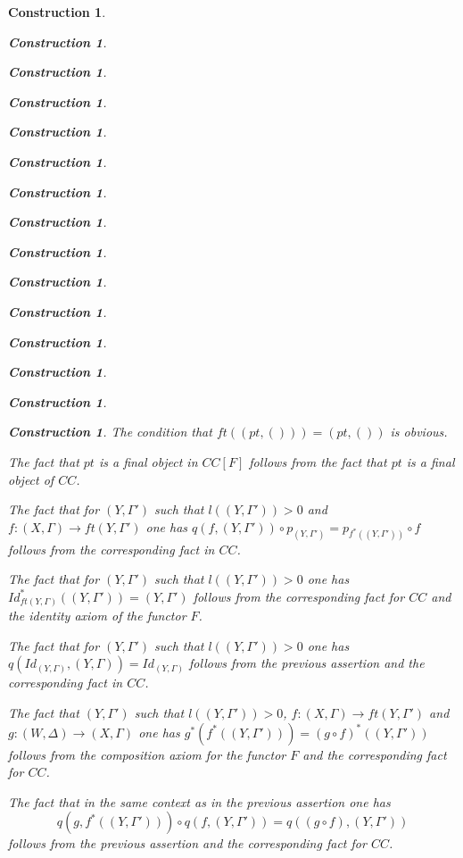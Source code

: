 \documentclass[12pt]{amsart}
\newtheorem{construction}[proposition]{Construction}
\newcommand{\sr}{\rightarrow}
\begin{document}
\begin{construction}
\begin{construction}
\begin{construction}
\begin{construction}
\begin{construction}
\begin{construction}
\begin{construction}
\begin{construction}
\begin{construction}
\begin{construction}
\begin{construction}
\begin{construction}
\begin{construction}
\begin{construction}
\begin{construction}
The condition that $ft((pt,()))=(pt,())$ is obvious. 

The fact that $pt$ is a final object in $CC[F]$ follows from the fact that $pt$ is a final object of $CC$.

The fact that for $(Y,\Gamma')$ such that $l((Y,\Gamma'))>0$ and
$f:(X,\Gamma)\sr ft(Y,\Gamma')$ one has $q(f,(Y,\Gamma'))\circ
p_{(Y,\Gamma')}=p_{f^*((Y,\Gamma'))}\circ f$ follows from the corresponding
fact in $CC$.

The fact that for $(Y,\Gamma')$ such that $l((Y,\Gamma'))>0$ one has
$Id_{ft(Y,\Gamma)}^*((Y,\Gamma'))=(Y,\Gamma')$ follows from the corresponding
fact for $CC$ and the identity axiom of the functor $F$.

The fact that for $(Y,\Gamma')$ such that $l((Y,\Gamma'))>0$ one has
$q(Id_{(Y,\Gamma)},(Y,\Gamma))=Id_{(Y,\Gamma)}$ follows from the previous
assertion and the corresponding fact in $CC$.

The fact that $(Y,\Gamma')$ such that $l((Y,\Gamma'))>0$, $f:(X,\Gamma)\sr
ft(Y,\Gamma')$ and $g:(W,\Delta)\sr (X,\Gamma)$ one has
$g^*(f^*((Y,\Gamma')))=(g\circ f)^*((Y,\Gamma'))$ follows from the composition
axiom for the functor $F$ and the corresponding fact for $CC$.

The fact that in the same context as in the previous assertion one has
%
$$q(g,f^*((Y,\Gamma')))\circ q(f,(Y,\Gamma'))=q((g\circ f),(Y,\Gamma'))$$
%
follows from the previous assertion and the corresponding fact for $CC$. 


\end{construction}
\end{construction}
\end{construction}
\end{construction}
\end{construction}
\end{construction}
\end{construction}
\end{construction}
\end{construction}
\end{construction}
\end{construction}
\end{construction}
\end{construction}
\end{construction}
\end{construction}
\end{document}
